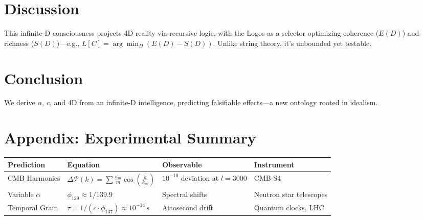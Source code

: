 \documentclass[12pt]{article}
\begin{document}
\section{Discussion}

This infinite-D consciousness projects 4D reality via recursive logic, with the Logos as a selector optimizing coherence (\(E(D)\)) and richness (\(S(D)\))—e.g., \(L[C] = \arg\min_D (E(D) - S(D))\). Unlike string theory, it’s unbounded yet testable.

\section{Conclusion}

We derive \(\alpha\), \(c\), and 4D from an infinite-D intelligence, predicting falsifiable effects—a new ontology rooted in idealism.

\section*{Appendix: Experimental Summary}
\begin{tabularx}{\textwidth}{|l|X|l|l|}
\hline
\textbf{Prediction} & \textbf{Equation} & \textbf{Observable} & \textbf{Instrument} \\
\hline
CMB Harmonics & \(\Delta \mathcal{P}(k) = \sum \frac{\kappa_m}{m} \cos\left(\frac{k}{k_m}\right)\) & \(10^{-10}\) deviation at \(l = 3000\) & CMB-S4 \\
\hline
Variable \(\alpha\) & \(\phi_{139} \approx 1/139.9\) & Spectral shifts & Neutron star telescopes \\
\hline
Temporal Grain & \(\tau = 1/(c \cdot \phi_{137}) \approx 10^{-14} \, \text{s}\) & Attosecond drift & Quantum clocks, LHC \\
\hline
\end{tabularx}
\end{document}

